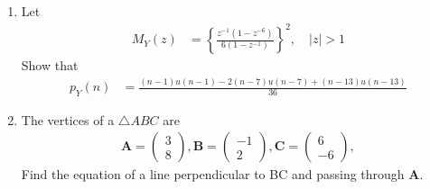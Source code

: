 \documentclass[journal,12pt,onecolumn]{IEEEtran}
\renewcommand\thesection{\arabic{section}}
\providecommand{\brak}[1]{\ensuremath{\left(#1\right)}}
\providecommand{\cbrak}[1]{\ensuremath{\left\{#1\right\}}}
\theoremstyle{remark}
\providecommand{\abs}[1]{\left\vert#1\right\vert}
\newcommand{\myvec}[1]{\ensuremath{\begin{pmatrix}#1\end{pmatrix}}}
\numberwithin{equation}{section}
\let\vec\mathbf
\begin{document}
\begin{enumerate}[label=\arabic*.,ref=\thesection.\theenumi]
\item Let 
\begin{align}
M_Y(z) &= \cbrak{\frac{z^{-1}\brak{1-z^{-6}}}{6\brak{1-z^{-1}}}}^2, \quad \abs{z} > 1
\label{eq:dice_xzprod}
\end{align}
Show that 
\begin{align}
p_Y(n) &= 
\frac{\brak{n-1}u(n-1) - 2 \brak{n-7}u(n-7)+\brak{n-13}u(n-13)}{36}
\label{eq:dice_xprod}
\end{align}
\item The vertices of a $\triangle ABC$ are 
	\begin{align}
		\vec{A} = \myvec{3\\8}, 
		\vec{B} = \myvec{-1\\2}, 
		\vec{C} = \myvec{6\\-6}, 
	\end{align}
	Find the equation of a line perpendicular to BC and passing through $\vec{A}$.

\end{enumerate}
\end{document}
